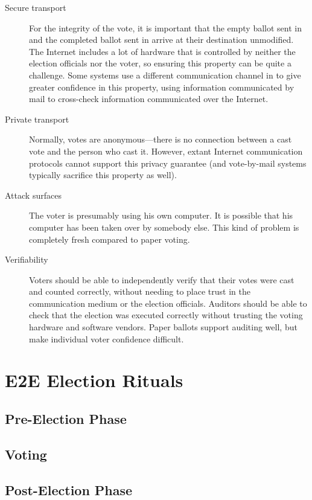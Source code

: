 \begin{description}
  \item[Secure transport] For the integrity of the vote, it is important
    that the empty ballot sent in  and the
    completed ballot sent in  arrive at
    their destination unmodified. The Internet includes a lot of hardware
    that is controlled by neither the election officials nor the voter, so
    ensuring this property can be quite a challenge. Some systems use a
    different communication channel in  to give
    greater confidence in this property, using information communicated by
    mail to cross-check information communicated over the Internet.
  \item[Private transport] Normally, votes are anonymous---there is no
    connection between a cast vote and the person who cast it. However,
    extant Internet communication protocols cannot support this privacy
    guarantee (and vote-by-mail systems typically sacrifice this property as
    well).
  \item[Attack surfaces] The voter is presumably using his own computer.
    It is possible that his computer has been taken over by somebody else.
    This kind of problem is completely fresh compared to paper voting.
  \item[Verifiability] Voters should be able to independently verify that
    their votes were cast and counted correctly, without needing to place
    trust in the communication medium or the election officials. Auditors
    should be able to check that the election was executed correctly without
    trusting the voting hardware and software vendors. Paper ballots support
    auditing well, but make individual voter confidence difficult.
\end{description}

\section{E2E Election Rituals}
\subsection{Pre-Election Phase}
\subsection{Voting}
\subsection{Post-Election Phase}
